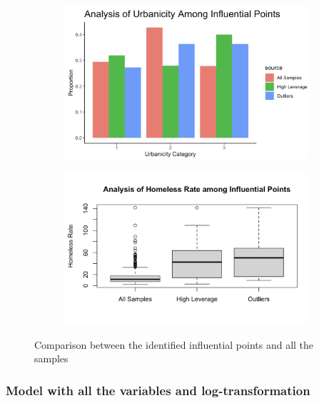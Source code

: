 \documentclass[12pt]{article}
\begin{document}
\begin{figure}[htp]
    \centering
    \begin{subfigure}[b]{.45\textwidth}
    \includegraphics[width=\textwidth]{outlier_urban.png}
    \caption{}
    \label{subfig:outlier_urban}
    \end{subfigure}
    \begin{subfigure}[b]{.45\textwidth}
    \includegraphics[width=\textwidth]{outlier_pit.png}
    \caption{}
    \label{subfig:outlier_pit}
    \end{subfigure}
    \caption{Comparison between the identified influential points and all the samples}
    \label{fig:outliers}
\end{figure}

\subsubsection{Model with all the variables and log-transformation}
\end{document}
